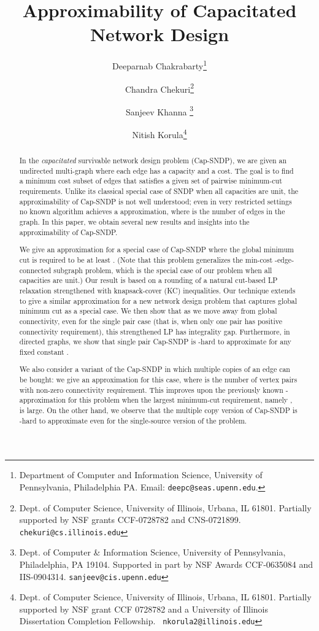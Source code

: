 \documentclass[11pt]{article}
\title{Approximability of Capacitated Network Design}
\author{
Deeparnab Chakrabarty\thanks{Department of Computer and Information Science, University of Pennsylvania,
Philadelphia PA. Email: {\tt deepc@seas.upenn.edu}.}
\and
Chandra Chekuri\thanks{Dept. of Computer Science, University of Illinois,
Urbana, IL 61801. Partially supported by NSF grants CCF-0728782 and
CNS-0721899. {\tt chekuri@cs.illinois.edu}}
\and
Sanjeev Khanna \thanks{Dept. of Computer \& Information Science, University of Pennsylvania,
Philadelphia, PA 19104. Supported in
part by NSF Awards CCF-0635084 and IIS-0904314. {\tt sanjeev@cis.upenn.edu}}
\and
Nitish Korula\thanks{Dept. of Computer Science, University of Illinois, Urbana,
    IL 61801. Partially supported by NSF grant CCF 0728782 and a
    University of Illinois Dissertation Completion Fellowship. {\tt
      nkorula2@illinois.edu}}
}
\date{}
\newcounter{thm0Rcopies}
\newcounter{thm_saved}
\begin{document}
\maketitle
\begin{abstract}
  In the {\em capacitated} survivable network design problem
  (Cap-SNDP), we are given an undirected multi-graph where each edge
  has a capacity and a cost.  The goal is to find a minimum cost
  subset of edges that satisfies a given set of pairwise minimum-cut
  requirements.  Unlike its classical special case of SNDP when all
  capacities are unit, the approximability of Cap-SNDP is not well
  understood; even in very restricted settings no known algorithm
  achieves a  approximation, where  is the number of edges in
  the graph. In this paper, we obtain several new results and insights
  into the approximability of Cap-SNDP.

  We give an  approximation for a special case of Cap-SNDP
  where the global minimum cut is required to be at least . (Note
  that this problem generalizes the min-cost -edge-connected
  subgraph problem, which is the special case of our problem when all
  capacities are unit.)  Our result is based on a rounding of a
  natural cut-based LP relaxation strengthened with knapsack-cover
  (KC) inequalities. Our technique extends to give a similar
  approximation for a new network design problem that captures global
  minimum cut as a special case.  We then show that as we move away
  from global connectivity, even for the single pair case (that is,
  when only one pair  has positive connectivity requirement),
  this strengthened LP has  integrality gap.  Furthermore,
  in directed graphs, we show that single pair Cap-SNDP is
  -hard to approximate for any fixed
  constant .

  We also consider a variant of the Cap-SNDP in which multiple copies
  of an edge can be bought: we give an  approximation for
  this case, where  is the number of vertex pairs with non-zero
  connectivity requirement. This improves upon the previously known
  -approximation for this problem when the
  largest minimum-cut requirement, namely , is large. On the
  other hand, we observe that the multiple copy version of Cap-SNDP is
  -hard to approximate even for the single-source
  version of the problem.
\end{abstract}
\thispagestyle{empty}
\newpage
\setcounter{page}{1}
\end{document}
